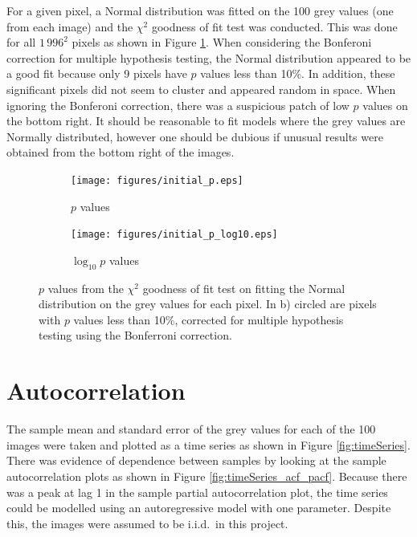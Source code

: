 \documentclass[12pt]{report}
\begin{document}
For a given pixel, a Normal distribution was fitted on the 100 grey values (one from each image) and the $\chi^2$ goodness of fit test was conducted. This was done for all $1\,996^2$ pixels as shown in Figure \ref{fig:initial_fit_normal_test}. When considering the Bonferoni correction \cite{weisstein2004bonferroni} for multiple hypothesis testing, the Normal distribution appeared to be a good fit because only 9 pixels have $p$ values less than 10\%. In addition, these significant pixels did not seem to cluster and appeared random in space. When ignoring the Bonferoni correction, there was a suspicious patch of low $p$ values on the bottom right. It should be reasonable to fit models where the grey values are Normally distributed, however one should be dubious if unusual results were obtained from the bottom right of the images.

\begin{figure}[p]
\centering
	\begin{subfigure}[b]{0.75\textwidth}
		\texttt{[image: figures/initial\_p.eps]}
		\caption{$p$ values}
	\end{subfigure}
	\begin{subfigure}[b]{0.75\textwidth}
		\texttt{[image: figures/initial\_p\_log10.eps]}
		\caption{$\log_{10} p$ values}
	\end{subfigure}
	\caption{$p$ values from the $\chi^2$ goodness of fit test on fitting the Normal distribution on the grey values for each pixel. In b) circled are pixels with $p$ values less than 10\%, corrected for multiple hypothesis testing using the Bonferroni correction.}
	\label{fig:initial_fit_normal_test}
\end{figure}

\section{Autocorrelation}
The sample mean and standard error of the grey values for each of the 100 images were taken and plotted as a time series as shown in Figure \ref{fig:timeSeries}. There was evidence of dependence between samples by looking at the sample autocorrelation plots as shown in Figure \ref{fig:timeSeries_acf_pacf}. Because there was a peak at lag 1 in the sample partial autocorrelation plot, the time series could be modelled using an autoregressive model with one parameter. Despite this, the images were assumed to be i.i.d.~in this project.
\end{document}
